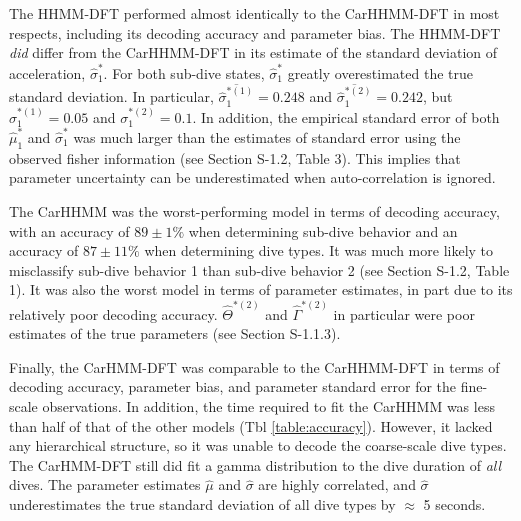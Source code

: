 The HHMM-DFT performed almost identically to the CarHHMM-DFT in most respects, including its decoding accuracy and parameter bias. 
The HHMM-DFT \textit{did} differ from the CarHHMM-DFT in its estimate of the standard deviation of acceleration, $\hat \sigma_1^*$. For both sub-dive states, $\hat \sigma_1^*$ greatly overestimated the true standard deviation. In particular, $\overline{\hat \sigma_1^{*(1)}} = 0.248$ and $\overline{\hat \sigma_1^{*(2)}} = 0.242$, but $\sigma_1^{*(1)} = 0.05$ and $\sigma_1^{*(2)} = 0.1$. In addition, the empirical standard error of both $\hat \mu_1^*$ and $\hat \sigma_1^*$ was much larger than the estimates of standard error using the observed fisher information (see Section S-1.2, Table 3). This implies that parameter uncertainty can be underestimated when auto-correlation is ignored.

The CarHHMM was the worst-performing model in terms of decoding accuracy, with an accuracy of $89 \pm 1\%$ when determining sub-dive behavior and an accuracy of $87 \pm 11\%$ when determining dive types. It was much more likely to misclassify sub-dive behavior 1 than sub-dive behavior 2 (see Section S-1.2, Table 1). It was also the worst model in terms of parameter estimates, in part due to its relatively poor decoding accuracy. $\hat \Theta^{*(2)}$ and $\hat \Gamma^{*(2)}$ in particular were poor estimates of the true parameters (see Section S-1.1.3).

Finally, the CarHMM-DFT was comparable to the CarHHMM-DFT in terms of decoding accuracy, parameter bias, and parameter standard error for the fine-scale observations. In addition, the time required to fit the CarHHMM was less than half of that of the other models (Tbl \ref{table:accuracy}). However, it lacked any hierarchical structure, so it was unable to decode the coarse-scale dive types. The CarHMM-DFT still did fit a gamma distribution to the dive duration of \textit{all} dives. The parameter estimates $\hat \mu$ and $\hat \sigma$ are highly correlated, and $\hat \sigma$ underestimates the true standard deviation of all dive types by $\approx$ 5 seconds.




